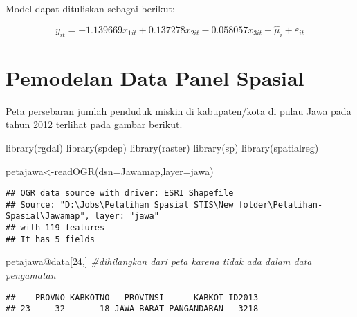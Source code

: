 \documentclass[
]{book}
\newenvironment{Shaded}{\begin{snugshade}}{\end{snugshade}}
\newcommand{\AttributeTok}[1]{\textcolor[rgb]{0.77,0.63,0.00}{#1}}
\newcommand{\CommentTok}[1]{\textcolor[rgb]{0.56,0.35,0.01}{\textit{#1}}}
\newcommand{\DecValTok}[1]{\textcolor[rgb]{0.00,0.00,0.81}{#1}}
\newcommand{\FunctionTok}[1]{\textcolor[rgb]{0.00,0.00,0.00}{#1}}
\newcommand{\NormalTok}[1]{#1}
\newcommand{\OtherTok}[1]{\textcolor[rgb]{0.56,0.35,0.01}{#1}}
\newcommand{\SpecialCharTok}[1]{\textcolor[rgb]{0.00,0.00,0.00}{#1}}
\newcommand{\StringTok}[1]{\textcolor[rgb]{0.31,0.60,0.02}{#1}}
\begin{document}
Model dapat dituliskan sebagai berikut:

\[y_{it}=-1.139669x_{1it}+0.137278x_{2it}-0.058057x_{3it}+\hat{\mu}_i+\varepsilon_{it}\]

\hypertarget{pemodelan-data-panel-spasial}{%
\section{Pemodelan Data Panel Spasial}\label{pemodelan-data-panel-spasial}}

Peta persebaran jumlah penduduk miskin di kabupaten/kota di pulau Jawa pada tahun 2012 terlihat pada gambar berikut.

\begin{Shaded}
\begin{Highlighting}[]
\FunctionTok{library}\NormalTok{(rgdal)}
\FunctionTok{library}\NormalTok{(spdep)}
\FunctionTok{library}\NormalTok{(raster)}
\FunctionTok{library}\NormalTok{(sp)}
\FunctionTok{library}\NormalTok{(spatialreg)}

\NormalTok{petajawa}\OtherTok{\textless{}{-}}\FunctionTok{readOGR}\NormalTok{(}\AttributeTok{dsn=}\StringTok{\textquotesingle{}Jawamap\textquotesingle{}}\NormalTok{,}\AttributeTok{layer=}\StringTok{\textquotesingle{}jawa\textquotesingle{}}\NormalTok{)}
\end{Highlighting}
\end{Shaded}

\begin{verbatim}
## OGR data source with driver: ESRI Shapefile 
## Source: "D:\Jobs\Pelatihan Spasial STIS\New folder\Pelatihan-Spasial\Jawamap", layer: "jawa"
## with 119 features
## It has 5 fields
\end{verbatim}

\begin{Shaded}
\begin{Highlighting}[]
\NormalTok{petajawa}\SpecialCharTok{@}\NormalTok{data[}\DecValTok{24}\NormalTok{,] }\CommentTok{\#dihilangkan dari peta karena tidak ada dalam data pengamatan}
\end{Highlighting}
\end{Shaded}

\begin{verbatim}
##    PROVNO KABKOTNO   PROVINSI      KABKOT ID2013
## 23     32       18 JAWA BARAT PANGANDARAN   3218
\end{verbatim}
\end{document}
